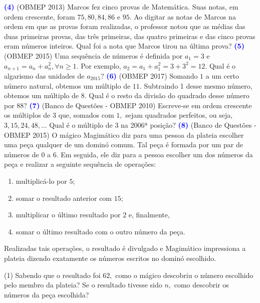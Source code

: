 \documentclass[12pt, a4paper]{article}
\newcommand{\negrito}[1]{\mbox{\boldmath{$#1$}}}
\begin{document}
\textcolor{blue}{\bf(4)} (OBMEP 2013) Marcos fez cinco provas de Matemática. Suas notas, em ordem crescente, foram $75,80, 84, 86$ e $95.$ Ao digitar as notas de Marcos na ordem em que as provas foram realizadas, o professor notou que as médias das duas primeiras provas, das três primeiras, das quatro primeiras e das cinco provas eram números inteiros. Qual foi a nota que Marcos tirou na última prova?
\newline\newline
\textcolor{blue}{\bf(5)} (OBMEP 2015) Uma sequência de números é definida por $a_1 = 3$ e $a_{n+1} = a_n + a_n^2, \forall n \ge 1.$ Por exemplo, $a_2 = a_1 + a_1^2 = 3 + 3^2 = 12.$ Qual é o algarismo das unidades de $a_{2015}?$
\newline\newline
\textcolor{blue}{\bf(6)} (OBMEP 2017) Somando $1$ a um certo número natural, obtemos um múltiplo de $11.$ Subtraindo 1 desse mesmo número, obtemos um múltiplo de $8.$ Qual é o resto da divisão do quadrado desse número por $88?$
\newline\newline
\textcolor{blue}{\bf(7)} (Banco de Questões - OBMEP 2010) Escreve-se em ordem crescente os múltiplos de $3$ que, somados com $1,$ sejam quadrados perfeitos, ou seja, $3, 15, 24, 48, \ldots$ Qual é o múltiplo de $3$ na 2006ª posição?
\newline\newline
\textcolor{blue}{\bf(8)} (Banco de Questões - OBMEP 2015) O mágico Magimático diz para uma pessoa da plateia escolher uma peça qualquer de um dominó comum. Tal peça é formada por um par de números de $0$ a $6.$ Em seguida, ele diz para a pessoa escolher um dos números da peça e realizar a seguinte sequência
de operações:
\begin{enumerate}
    \item multiplicá-lo por $5;$
\item somar o resultado anterior com $15;$
\item multiplicar o último resultado por $2$ e, finalmente,
\item somar o último resultado com o outro número da peça.
\end{enumerate}
Realizadas tais operações, o resultado é divulgado e Magimático impressiona a plateia dizendo exatamente os números escritos no dominó escolhido.
\begin{tasks}[counter-format={(tsk[a])},label-width=3.6ex, label-format = {\bfseries}, column-sep = {0pt}](1)
\task[\textcolor{Floresta}{$\negrito{(a)} $}] Sabendo que o resultado foi $62,$ como o mágico descobriu o número escolhido pelo membro da plateia?
\task[\textcolor{Floresta}{$\negrito{(b)} $}] Se o resultado tivesse sido $n,$ como descobrir os números da peça escolhida?
\end{tasks}
\end{document}
